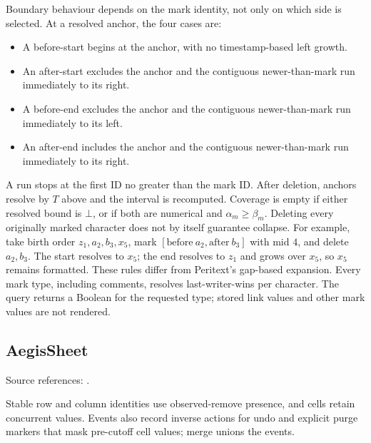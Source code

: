 Boundary behaviour depends on the mark identity, not only on which side
is selected. At a resolved anchor, the four cases are:
\begin{itemize}
\item A before-start begins at the anchor, with no timestamp-based left growth.
\item An after-start excludes the anchor and the contiguous newer-than-mark
  run immediately to its right.
\item A before-end excludes the anchor and the contiguous newer-than-mark
  run immediately to its left.
\item An after-end includes the anchor and the contiguous newer-than-mark
  run immediately to its right.
\end{itemize}
A run stops at the first ID no greater than the mark ID. After deletion,
anchors resolve by $T$ above and the interval is recomputed. Coverage is
empty if either resolved bound is $\bot$, or if both are numerical and
$\alpha_m\ge\beta_m$.
Deleting every originally marked character does not by itself guarantee
collapse. For example, take birth order $z_1,a_2,b_3,x_5$, mark
$[\mathrm{before}\ a_2,\mathrm{after}\ b_3]$ with mid $4$, and delete $a_2,b_3$.
The start resolves to $x_5$; the end resolves to $z_1$ and grows over $x_5$,
so $x_5$ remains formatted. These rules differ from Peritext's gap-based
expansion. Every mark type, including comments, resolves last-writer-wins
per character. The query returns a Boolean for the requested type; stored
link values and other mark values are not rendered.


\subsection{AegisSheet}
\label{app:dt-aegis-sheet}

\noindent Source references: \cite{AegisSheet}.




Stable row and column identities use observed-remove presence, and cells retain concurrent values. Events also record inverse actions for undo and explicit purge markers that mask pre-cutoff cell values; merge unions the events.

